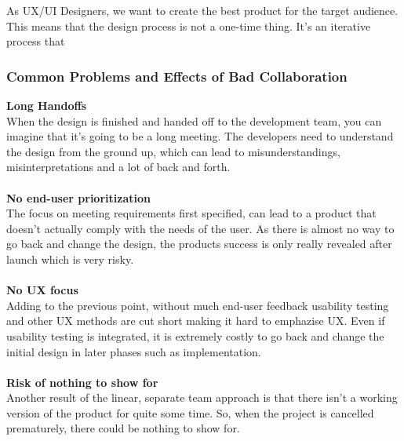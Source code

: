 As UX/UI Designers, we want to create the best product for the target audience. This means that the
design process is not a one-time thing. It's an iterative process that 

\subsubsection{Common Problems and Effects of Bad Collaboration}
\textbf{Long Handoffs} \\
When the design is finished and handed off to the development team, you can imagine that it's going
to be a long meeting. The developers need to understand the design from the ground up, which can
lead to misunderstandings, misinterpretations and a lot of back and forth.\\\\
\textbf{No end-user prioritization} \\
The focus on meeting requirements first specified, can lead to a product that doesn't actually comply
with the needs of the user. As there is almost no way to go back and change the design, the products
success is only really revealed after launch which is very risky.\\\\
\textbf{No UX focus} \\
Adding to the previous point, without much end-user feedback usability testing and other UX methods are
cut short making it hard to emphazise UX. Even if usability testing is integrated, it is extremely
costly to go back and change the initial design in later phases such as implementation.\\\\
\textbf{Risk of nothing to show for} \\
Another result of the linear, separate team approach is that there isn't a working version of the
product for quite some time. So, when the project is cancelled prematurely, there could be nothing
to show for.\\
